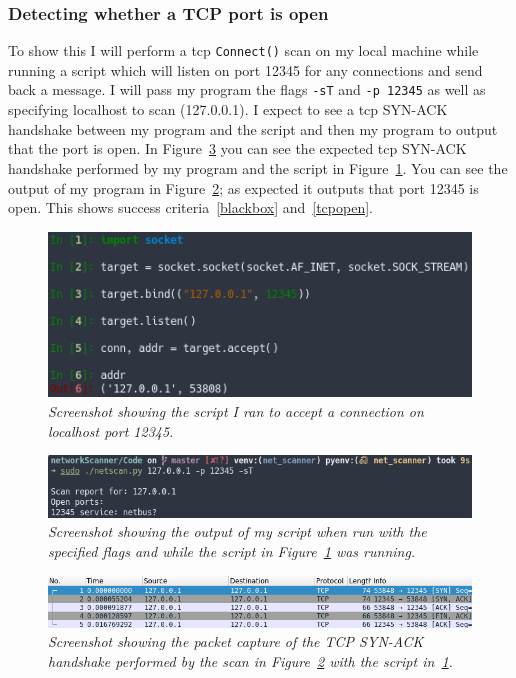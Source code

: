 \documentclass[titlepage]{article}
\let\Oldsubsubsection\subsubsection{}
\renewcommand{\subsubsection}{\FloatBarrier\Oldsubsubsection}
\begin{document}
\subsubsection{Detecting whether a TCP port is open}
To show this I will perform a \gls{tcp} \verb|Connect()| scan on my local
machine while running a script which will listen on port 12345 for any connections
and send back a message. I will pass my program the flags \verb|-sT| and
\verb|-p 12345| as well as specifying localhost to scan (127.0.0.1).
I expect to see a \gls{tcp} SYN-ACK handshake between my program and the script and
then my program to output that the port is open. In Figure~\ref{tcpopenpcap} you can
see the expected \gls{tcp} SYN-ACK handshake performed by my program and the script
in Figure~\ref{tcpopenscript}.
You can see the output of my program in Figure~\ref{tcpopenoutput}; as expected
it outputs that port 12345 is open. This shows success criteria~\ref{blackbox}
and~\ref{tcpopen}.

\begin{figure}[H]
  \centering
  \includegraphics[width=\textwidth]{tcpopenscript.png}
  \caption{\textit{%
    Screenshot showing the script I ran to accept a connection on localhost port 12345.
}}\label{tcpopenscript}
\end{figure}

\begin{figure}[H]
  \centering
  \includegraphics[width=\textwidth]{tcpopenoutput.png}
  \caption{\textit{%
    Screenshot showing the output of my script when run with the specified flags
    and while the script in Figure~\ref{tcpopenscript} was running.
}}\label{tcpopenoutput}
\end{figure}

\begin{figure}[H]
  \centering
  \includegraphics[width=\textwidth]{tcpopenpcap.png}
  \caption{\textit{%
    Screenshot showing the packet capture of the TCP SYN-ACK handshake performed
    by the scan in Figure~\ref{tcpopenoutput} with the script in~\ref{tcpopenscript}.
}}\label{tcpopenpcap}
\end{figure}
\end{document}
